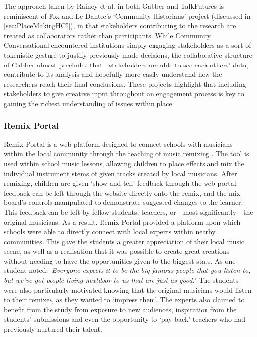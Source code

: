 The approach taken by Rainey et al. in both Gabber and TalkFutures is reminiscent of Fox and Le Dantec's `Community Historians' project (discussed in \ref{sec:PlaceMakingHCI}), in that stakeholders contributing to the research are treated as collaborators rather than participants. While Community Conversational encountered institutions simply engaging stakeholders as a sort of tokenistic gesture to justify previously made decisions, the collaborative structure of Gabber almost precludes that---stakeholders are able to see each others' data, contribute to its analysis and hopefully more easily understand how the researchers reach their final conclusions. These projects highlight that including stakeholders to give creative input throughout an engagement process is key to gaining the richest understanding of issues within place.

\subsubsection{Remix Portal}

Remix Portal is a web platform designed to connect schools with musicians within the local community through the teaching of music remixing \citep{Dodds2017}. The tool is used within school music lessons, allowing children to place effects and mix the individual instrument stems of given tracks created by local musicians. After remixing, children are given `show and tell' feedback through the web portal: feedback can be left through the website directly onto the remix, and the mix board's controls manipulated to demonstrate suggested changes to the learner. This feedback can be left by fellow students, teachers, or---most significantly---the original musicians. As a result, Remix Portal provided a platform upon which schools were able to directly connect with local experts within nearby communities. This gave the students a greater appreciation of their local music scene, as well as a realisation that it was possible to create great creations without needing to have the opportunities given to the biggest stars. As one student noted: `\textit{Everyone expects it to be the big famous people that you listen to, but we've got people living nextdoor to us that are just as good.}' The students were also particularly motivated knowing that the original musicians would listen to their remixes, as they wanted to `impress them'. The experts also claimed to benefit from the study from exposure to new audiences, inspiration from the students' submissions and even the opportunity to `pay back' teachers who had previously nurtured their talent.


